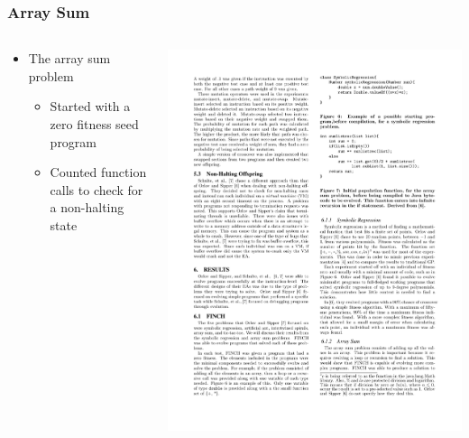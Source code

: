 \documentclass{beamer}
\begin{document}
\begin{frame}
\frametitle{Array Sum}
\begin{columns}
\begin{column}{0.5\textwidth}
\begin{itemize}
\item The array sum problem
\begin{itemize}
\item Started with a zero fitness seed program
\item Counted function calls to check for a non-halting state
\end{itemize}

\end{itemize}
\end{column}
\begin{column}{0.5\textwidth}
\includegraphics[height=.38\textheight]{Illustrations/seedRec.pdf}
\end{column}
\end{columns}
\end{frame}
\end{document}

